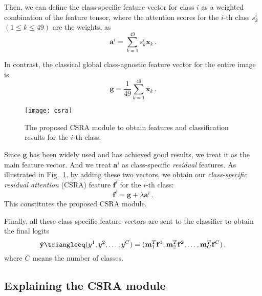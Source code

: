 \documentclass[10pt,twocolumn,letterpaper]{article}
\begin{document}
Then, we can define the class-specific feature vector for class $i$ as a weighted combination of the feature tensor, where the attention scores for the $i$-th class $s_k^i$ $(1 \le k \le 49)$ are the weights, as
\begin{equation} 
	\label{eq:ai}
	\mathbf{a}^i = \sum_{k=1}^{49} s_k^i \mathbf{x}_k \,.
\end{equation}

In contrast, the classical global class-agnostic feature vector for the entire image is
\begin{equation} 
	\label{eq:g}
	\mathbf{g} = \frac{1}{49}\sum_{k=1}^{49} \mathbf{x}_k \,.
\end{equation}

\begin{figure}
	\centering
	\texttt{[image: csra]}
	\caption{The proposed CSRA module to obtain features and classification results for the $i$-th class.}
	\label{fig:CSRA}
\end{figure}

Since $\mathbf{g}$ has been widely used and has achieved good results, we treat it as the main feature vector. And we treat $\mathbf{a}^i$ as class-specific \emph{residual} features. As illustrated in Fig.~\ref{fig:CSRA}, by adding these two vectors, we obtain our \emph{class-specific residual attention} (CSRA) feature $\mathbf{f}^i$ for the $i$-th class:
\begin{equation} 
	\label{eq:fi}
	\mathbf{f}^i = \mathbf{g} + \lambda \mathbf{a}^i \,.
\end{equation}
This constitutes the proposed CSRA module.

Finally, all these class-specific feature vectors are sent to the classifier to obtain the final logits
\begin{equation} 
	\hat{\mathbf{y}} \triangleeq (y^1, y^2, \dots, y^C) = (\mathbf{m}_1^T\mathbf{f}^1, \mathbf{m}_2^T\mathbf{f}^2, \dots, \mathbf{m}_C^T\mathbf{f}^C) \,,
	\label{eq:logits}
\end{equation}
where $C$ means the number of classes.

\subsection{Explaining the CSRA module}
\end{document}

